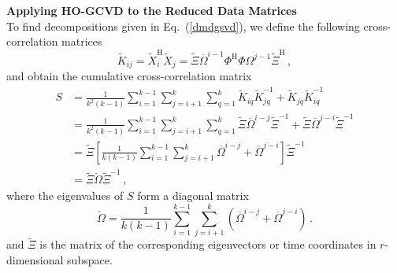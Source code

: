 \documentclass[10pt]{article}
\newcommand{\eq}[1]{Eq.\ (\ref{#1})}
\begin{document}
\noindent\textbf{Applying HO-GCVD to the Reduced Data Matrices} \\
To find decompositions given in \eq{dmdgsvd}, we define the following cross-correlation matrices
\begin{equation}
    \tilde K_{ij} = {\tilde X_i^\mathrm{H} \tilde X_j} = {\tilde \Xi \overline \Omega^{i-1} \Phi^\mathrm{H} \Phi \Omega^{j-1}  \tilde \Xi^\mathrm{H}  }\,,
\end{equation}
and obtain the cumulative cross-correlation matrix
\begin{equation}
\begin{aligned}
  S &= \frac{1}{k^2(k-1)}
    \sum_{i=1}^{k-1} 
    \sum_{j=i+1}^k
    \sum_{q=1}^k  
    \tilde K_{iq}\tilde K_{jq}^{-1} +  \tilde K_{jq}\tilde K_{iq}^{-1}\\
    &= \frac{1}{k^2(k-1)}
    \sum_{i=1}^{k-1} 
    \sum_{j=i+1}^k
    \sum_{q=1}^k  
    \tilde \Xi \overline \Omega^{i-j} \tilde \Xi^{-1}+  \tilde \Xi  \overline \Omega^{j-i} \tilde \Xi^{-1}\\
    &=  
    \tilde \Xi \left[\frac{1}{k(k-1)}
    \sum_{i=1}^{k-1} 
    \sum_{j=i+1}^k
\overline \Omega^{i-j} + \overline \Omega^{j-i} \right]\tilde \Xi^{-1}\\
&=  \tilde \Xi \check \Omega \tilde \Xi^{-1}\,,
\end{aligned}
\end{equation}
where the eigenvalues of $S$ form a diagonal matrix
\begin{equation}
    \check \Omega = \frac{1}{k(k-1)}
    \sum_{i=1}^{k-1} 
    \sum_{j=i+1}^k
 \left(\overline \Omega^{i-j} + \overline \Omega^{j-i}\right)\,.
\end{equation}
and $\tilde \Xi$ is the matrix of the corresponding eigenvectors or time coordinates in $r$-dimensional subspace.\\
\end{document}
